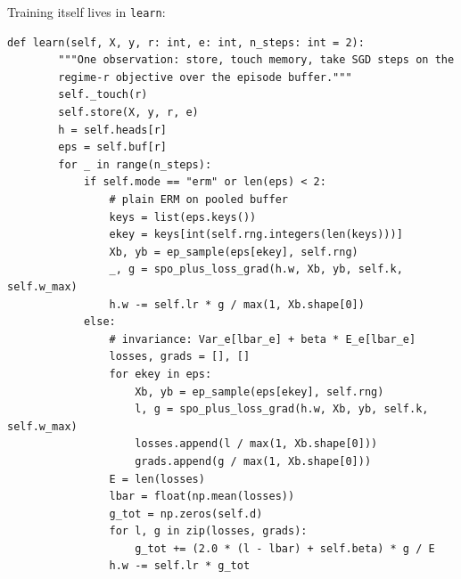 \documentclass[11pt,a4paper]{article}
\theoremstyle{definition}
\theoremstyle{plain}
\begin{document}
Training itself lives in \texttt{learn}:

\begin{lstlisting}[caption={ERM vs.\ invariance training over the episode buffer (\texttt{risp.py}).},label={lst:dd6-learn}]
    def learn(self, X, y, r: int, e: int, n_steps: int = 2):
        """One observation: store, touch memory, take SGD steps on the
        regime-r objective over the episode buffer."""
        self._touch(r)
        self.store(X, y, r, e)
        h = self.heads[r]
        eps = self.buf[r]
        for _ in range(n_steps):
            if self.mode == "erm" or len(eps) < 2:
                # plain ERM on pooled buffer
                keys = list(eps.keys())
                ekey = keys[int(self.rng.integers(len(keys)))]
                Xb, yb = ep_sample(eps[ekey], self.rng)
                _, g = spo_plus_loss_grad(h.w, Xb, yb, self.k, self.w_max)
                h.w -= self.lr * g / max(1, Xb.shape[0])
            else:
                # invariance: Var_e[lbar_e] + beta * E_e[lbar_e]
                losses, grads = [], []
                for ekey in eps:
                    Xb, yb = ep_sample(eps[ekey], self.rng)
                    l, g = spo_plus_loss_grad(h.w, Xb, yb, self.k, self.w_max)
                    losses.append(l / max(1, Xb.shape[0]))
                    grads.append(g / max(1, Xb.shape[0]))
                E = len(losses)
                lbar = float(np.mean(losses))
                g_tot = np.zeros(self.d)
                for l, g in zip(losses, grads):
                    g_tot += (2.0 * (l - lbar) + self.beta) * g / E
                h.w -= self.lr * g_tot
\end{lstlisting}
\end{document}
